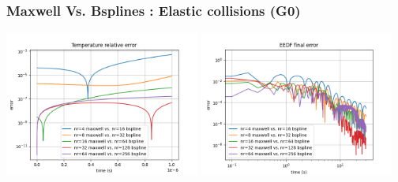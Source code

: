 \documentclass[mathserif, aspectratio=169]{beamer}
\begin{document}
	\begin{frame}
		\frametitle{Maxwell Vs. Bsplines : Elastic collisions (G0)}
		\includegraphics[width=0.48\textwidth]{g0_mw_bs_temp_error.png}
		\includegraphics[width=0.48\textwidth]{g0_mw_bs_eedf_final_error.png}
	\end{frame}
\end{document}
